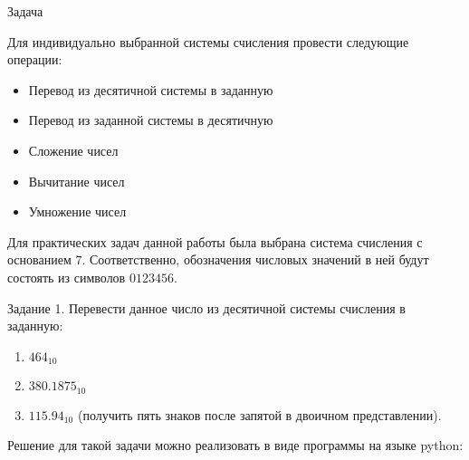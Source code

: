 \begin{center}
    Задача
\end{center}
Для индивидуально выбранной системы счисления провести следующие операции:
\begin{itemize}
    \item Перевод из десятичной системы в заданную
    \item Перевод из заданной системы в десятичную
    \item Сложение чисел
    \item Вычитание чисел
    \item Умножение чисел
\end{itemize}

Для практических задач данной работы была выбрана система счисления с основанием $7$. Соответственно, обозначения числовых значений в ней будут состоять из символов $0123456$.
\vspace{28pt}

Задание 1. Перевести данное число из десятичной системы счисления в заданную:
\begin{enumerate}
    \item $464_{10}$
    \item $380.1875_{10}$
    \item $115.94_{10}$ (получить пять знаков после запятой в двоичном представлении).
\end{enumerate}

Решение для такой задачи можно реализовать в виде программы на языке python:




